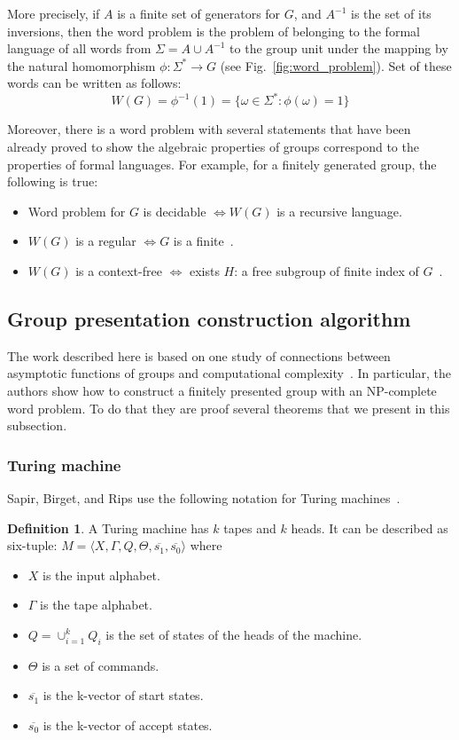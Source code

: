 \documentclass[conference]{IEEEtran}
\theoremstyle{definition}
\newtheorem{defn}{Definition}[section]
\begin{document}
More precisely, if $ A $ is a finite set of generators for $G$, and $A^{-1}$
is the set of its inversions, then the word problem is the problem of belonging
to the formal language of all words from $\Sigma = A \cup A ^{-1}$
to the group unit under the mapping by the natural homomorphism $ \phi: \Sigma ^ * \to G $ (see Fig.~\ref{fig:word_problem}). Set of these words can be written as follows:
$$W (G) = \phi ^ {- 1} (1) = \{ \omega \in \Sigma ^ *: \phi (\omega) = 1 \}$$

Moreover, there is a word problem with several statements that have been already
proved to show the algebraic properties of groups correspond to the properties of formal languages.
For example, for a finitely generated group, the following is true:
\begin{itemize}
    \item Word problem for $G$ is decidable $\iff W(G)$ is a recursive language.
    \item $W(G)$ is a regular $\iff G$ is a finite~\cite{Anisimov}.
    \item $W(G)$ is a context-free $\iff$ exists $H$: a free subgroup of finite index of $G$~\cite{Muller}.
\end{itemize}

\subsection{Group presentation construction algorithm}

The work described here is based on one study of connections
between asymptotic functions of groups and computational complexity~\cite{Sapir}.
In particular, the authors show how to construct a finitely presented group
with an NP-complete word problem. To do that they are proof several theorems
that we present in this subsection.

\subsubsection{Turing machine}

Sapir, Birget, and Rips use the following notation for Turing machines~\cite{Sapir}.
\begin{defn} \label{tm}
A Turing machine has $k$ tapes and $k$ heads. It can be described as six-tuple:
$M = \langle X, \Gamma, Q, \Theta, \overline{s_1}, \overline{s_0} \rangle$
where
\begin{itemize}
    \item $X$ is the input alphabet.
    \item $\Gamma$ is the tape alphabet.
    \item $Q = \cup_{i=1}^k Q_i$ is the set of states of the heads of the machine.
    \item $\Theta$ is a set of commands.
    \item $\overline{s_1}$ is the k-vector of start states.
    \item $\overline{s_0}$ is the k-vector of accept states.
\end{itemize}
\end{defn}
\end{document}
